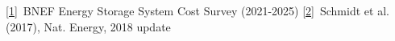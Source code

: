 \href{https://about.bnef.com/insights/commodities/global-energy-storage-market-to-grow-15-fold-by-2030/}{[1]}~BNEF Energy Storage System Cost Survey (2021-2025)\quad
\href{https://doi.org/10.1038/nenergy.2017.110}{[2]}~Schmidt et al. (2017), Nat. Energy, 2018 update
